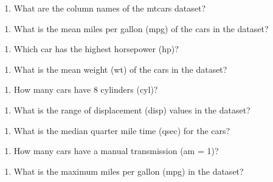 \documentclass[
  letterpaper,
  DIV=11,
  numbers=noendperiod]{scrreprt}
\providecommand{\tightlist}{%
  \setlength{\itemsep}{0pt}\setlength{\parskip}{0pt}}\usepackage{longtable,booktabs,array}
\begin{document}
\begin{enumerate}
\def\labelenumi{\arabic{enumi}.}
\setcounter{enumi}{3}
\tightlist
\item
  What are the column names of the mtcars dataset?
\end{enumerate}

\begin{enumerate}
\def\labelenumi{\arabic{enumi}.}
\setcounter{enumi}{4}
\tightlist
\item
  What is the mean miles per gallon (mpg) of the cars in the dataset?
\end{enumerate}

\begin{enumerate}
\def\labelenumi{\arabic{enumi}.}
\setcounter{enumi}{5}
\tightlist
\item
  Which car has the highest horsepower (hp)?
\end{enumerate}

\begin{enumerate}
\def\labelenumi{\arabic{enumi}.}
\setcounter{enumi}{6}
\tightlist
\item
  What is the mean weight (wt) of the cars in the dataset?
\end{enumerate}

\begin{enumerate}
\def\labelenumi{\arabic{enumi}.}
\setcounter{enumi}{7}
\tightlist
\item
  How many cars have 8 cylinders (cyl)?
\end{enumerate}

\begin{enumerate}
\def\labelenumi{\arabic{enumi}.}
\setcounter{enumi}{8}
\tightlist
\item
  What is the range of displacement (disp) values in the dataset?
\end{enumerate}

\begin{enumerate}
\def\labelenumi{\arabic{enumi}.}
\setcounter{enumi}{9}
\tightlist
\item
  What is the median quarter mile time (qsec) for the cars?
\end{enumerate}

\begin{enumerate}
\def\labelenumi{\arabic{enumi}.}
\setcounter{enumi}{10}
\tightlist
\item
  How many cars have a manual transmission (am = 1)?
\end{enumerate}

\begin{enumerate}
\def\labelenumi{\arabic{enumi}.}
\setcounter{enumi}{11}
\tightlist
\item
  What is the maximum miles per gallon (mpg) in the dataset?
\end{enumerate}
\end{document}
